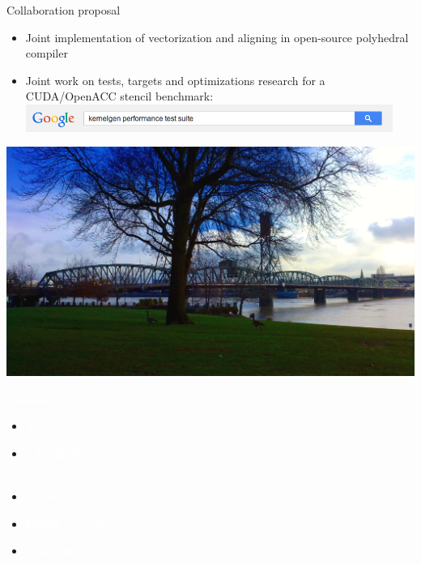 \documentclass[aspectratio=169]{beamer}
\begin{document}
\begin{frame}[fragile]{Collaboration proposal}

\begin{itemize}
\item Joint implementation of vectorization and aligning in open-source polyhedral compiler
\vskip5pt
\item Joint work on tests, targets and optimizations research for a CUDA/OpenACC stencil benchmark:\\
\vskip10pt
\includegraphics[width=12cm]{figures/perfsuite}
\end{itemize}

\end{frame}



\usebackgroundtemplate%
{%
    \includegraphics[width=\paperwidth,height=\paperheight]{figures/cover}%
}
\begin{frame}[fragile]{}

\vskip35pt
\begin{minipage}{0.38cm}
\hskip0.38cm
\end{minipage}%
\begin{minipage}{13cm}
\begin{center}
\textcolor{white}{\Huge \textbf{Thanks!}}
\end{center}
\vskip115pt
{\tiny
\begin{itemize}
\item[] \textcolor{white}{This presentation is supported by}
\item[] \textcolor{white}{\textbf{EXA2CT}: Exascale Algorithms and Advanced Computational Techniques (EU FP7-ICT programme)}
\vskip10pt
\item[] \textcolor{white}{Hardware access is provided by}
\item[] \textcolor{white}{\textbf{CSCS}: Swiss National Supercomputing Centre}
\item[] \textcolor{white}{\textbf{tesla-cmc}: GPU server @ Lomonosov Moscow State University}
\end{itemize}}
\end{minipage}
\end{frame}
\end{document}
